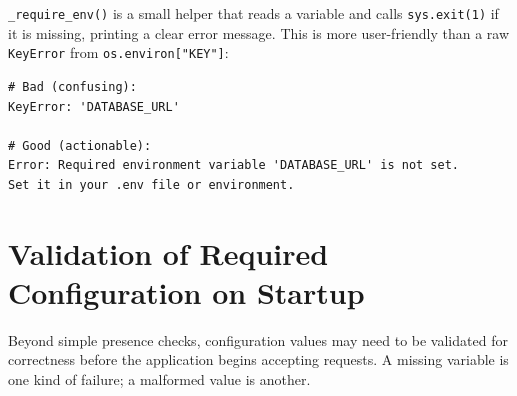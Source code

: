 \noindent{}\texttt{\_require\_env()} is a small helper that reads a variable and calls \texttt{sys.exit(1)} if it is missing, printing a clear error message. This is more user-friendly than a raw \texttt{KeyError} from \texttt{os.environ{[}"KEY"{]}}:

\begin{outputbox}[short]
\begin{Verbatim}[fontsize=\codesize, breaklines, breakanywhere, breaksymbolleft={\tiny\textcolor{muted}{$\hookrightarrow$}}]
# Bad (confusing):
KeyError: 'DATABASE_URL'

# Good (actionable):
Error: Required environment variable 'DATABASE_URL' is not set.
Set it in your .env file or environment.
\end{Verbatim}
\end{outputbox}

\setcounter{section}{3}
\section{Validation of Required Configuration on Startup}\label{13-configuration-externalization:134-validation-of-required-configuration-on-startup}

Beyond simple presence checks, configuration values may need to be validated for correctness before the application begins accepting requests. A missing variable is one kind of failure; a malformed value is another.

